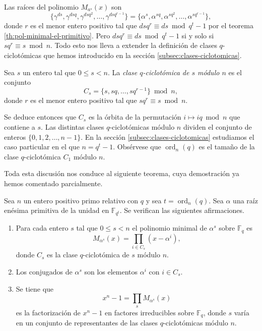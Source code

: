 Las raíces del polinomio \(M_{a^s}(x)\) son
\[
  \{\gamma^{ds}, \gamma^{dsq}, \gamma^{dsq^2}, \dots, \gamma^{dsq^{r-1}}\} = \{\alpha^s, \alpha^{sq}, \alpha^{sq^2}, \dots, \alpha^{sq^{r-1}}\},
\]
donde \(r\) es el menor entero positivo tal que \(dsq^r \equiv ds \bmod q^t - 1\) por el teorema \ref{th:pol-minimal-el-primitivo}.
Pero \(dsq^r \equiv ds \bmod q^t - 1\) si y solo si \(sq^r \equiv s \bmod n\).
Todo esto nos lleva a extender la definición de clases \(q\)-ciclotómicas que hemos introducido en la sección \ref{subsec:clases-ciclotomicas}.
\begin{definition}
  Sea \(s\) un entero tal que \(0 \leq s < n\).
  La \textit{clase \(q\)-ciclotómica de \(s\) módulo \(n\)} es el conjunto
  \[
    C_s = \{s, sq, \dots, sq^{r-1}\} \bmod n, 
  \]
  donde \(r\) es el menor entero positivo tal que \(sq^r \equiv s \bmod n\).
\end{definition}
Se deduce entonces que \(C_s\) es la órbita de la permutación \(i \mapsto iq \bmod n\) que contiene a \(s\).
Las distintas clases \(q\)-ciclotómicas módulo \(n\) dividen el conjunto de enteros \(\{0, 1, 2, \dots, n - 1\}\).
En la sección \ref{subsec:clases-ciclotomicas} estudiamos el caso particular en el que \(n = q^t - 1\).
Obsérvese que \(\operatorname{ord}_n(q)\) es el tamaño de la clase \(q\)-ciclotómica \(C_1\) módulo \(n\).

Toda esta discusión nos conduce al siguiente teorema, cuya demostración ya hemos comentado parcialmente.

\begin{theorem}
  \label{th:pol-minimal-raiz-primitiva}
  Sea \(n\) un entero positivo primo relativo con \(q\) y sea \(t = \operatorname{ord}_n(q)\).
  Sea \(\alpha\) una raíz enésima primitiva de la unidad en \(\mathbb F_{q^t}\).
  Se verifican las siguientes afirmaciones.
  \begin{enumerate}
    \item Para cada entero \(s\) tal que \(0 \leq s < n\) el polinomio minimal de \(\alpha^s\) sobre \(\mathbb F_q\) es
    \[
      M_{\alpha^s}(x) = \prod_{i \in C_s}(x - \alpha^i),
    \]
    donde \(C_s\) es la clase \(q\)-ciclotómica de \(s\) módulo \(n\).
    \label{thi:pol-minimal-raiz-primitiva-producto}
    \item Los conjugados de \(\alpha^s\) son los elementos \(\alpha^i\) con \(i \in C_s\).
    \item Se tiene que
    \[
      x^n - 1 = \prod_s M_{\alpha^s}(x)
    \]
    es la factorización de \(x^n - 1\) en factores irreducibles sobre \(\mathbb F_q\), donde \(s\) varía en un conjunto de representantes de las clases \(q\)-ciclotómicas módulo \(n\).
  \end{enumerate}
\end{theorem}

